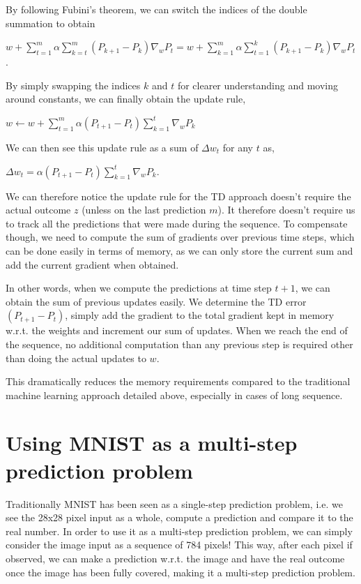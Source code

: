 \documentclass{article}
\begin{document}
By following Fubini's theorem, we can switch the indices of the double summation to obtain

$w + \sum \limits_{t=1}^m \alpha \sum \limits_{k=t}^m (P_{k+1} - P_k) \nabla_w P_t = w + \sum \limits_{k=1}^m \alpha \sum \limits_{t=1}^k (P_{k+1} - P_k) \nabla_w P_t$.

By simply swapping the indices $k$ and $t$ for clearer understanding and moving around constants, we can finally obtain the update rule,

$w \leftarrow w + \sum \limits_{t=1}^m \alpha (P_{t+1} - P_t) \sum \limits_{k=1}^t \nabla_w P_k$

We can then see this update rule as a sum of $\Delta w_t$ for any $t$ as,

$\Delta w_t = \alpha (P_{t+1} - P_t) \sum \limits_{k=1}^t \nabla_w P_k$.

We can therefore notice the update rule for the TD approach doesn't require the actual outcome $z$ (unless on the last prediction $m$). It therefore doesn't require us to track all the predictions that were made during the sequence. To compensate though, we need to compute the sum of gradients over previous time steps, which can be done easily in terms of memory, as we can only store the current sum and add the current gradient when obtained.

In other words, when we compute the predictions at time step $t+1$, we can obtain the sum of previous updates easily. We determine the TD error $(P_{t+1} - P_t)$, simply add the gradient to the total gradient kept in memory w.r.t. the weights and increment our sum of updates. When we reach the end of the sequence, no additional computation than any previous step is required other than doing the actual updates to $w$.

This dramatically reduces the memory requirements compared to the traditional machine learning approach detailed above, especially in cases of long sequence.

\section{Using MNIST as a multi-step prediction problem}

Traditionally MNIST has been seen as a single-step prediction problem, i.e. we see the 28x28 pixel input as a whole, compute a prediction and compare it to the real number. In order to use it as a multi-step prediction problem, we can simply consider the image input as a sequence of 784 pixels! This way, after each pixel if observed, we can make a prediction w.r.t. the image and have the real outcome once the image has been fully covered, making it a multi-step prediction problem.
\end{document}

